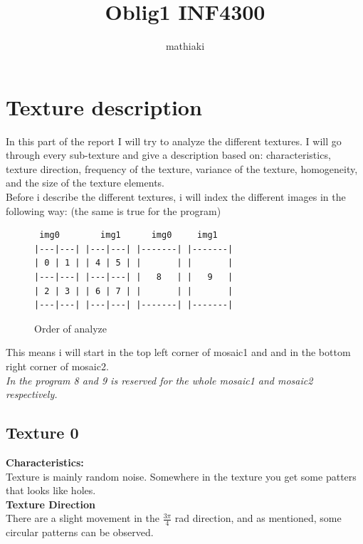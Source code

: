 \documentclass{article}
\title{Oblig1 INF4300}
\author{mathiaki}
\begin{document}
\maketitle

\newpage
\tableofcontents
\newpage

\section{Texture description}
In this part of the report I will try to analyze the different textures.
I will go through every sub-texture and give a description based on: characteristics, texture direction, frequency of the texture, variance of the texture, homogeneity, and the size of the texture elements.  \\

 
Before i describe the different textures, i will index the different images in the following way: (the same is true for the program)\\
\begin{figure}[h]

\centering
\begin{BVerbatim}
 img0        img1      img0     img1
|---|---| |---|---| |-------| |-------|
| 0 | 1 | | 4 | 5 | |       | |       |
|---|---| |---|---| |   8   | |   9   |
| 2 | 3 | | 6 | 7 | |       | |       |
|---|---| |---|---| |-------| |-------|

\end{BVerbatim}
\caption{Order of analyze}%
\label{verb:comp}
\end{figure}


This means i will start in the top left corner of mosaic1 and and in the bottom right corner of mosaic2. \\
\textit{In the program 8 and 9 is reserved for the whole mosaic1 and mosaic2 respectively.} 

\newpage
\setcounter{subsection}{-1}
\subsection{Texture 0}
\textbf{Characteristics:}\\
Texture is mainly random noise. Somewhere in the texture you get some patters that looks like holes. \\

\textbf{Texture Direction}\\
There are a slight movement in the $\frac{3\pi}{4}$ rad direction, and as mentioned, some circular patterns can be observed. \\
\end{document}
